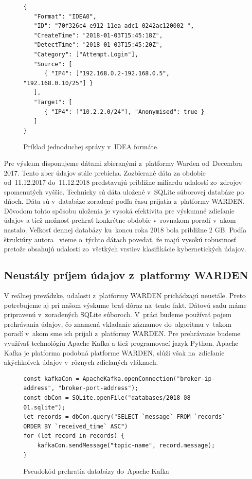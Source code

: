 \documentclass[thesismargins, thesislinespacing, openright, upjsfrontpage]{rnthesis}
\begin{document}
\begin{figure}
    \begin{lstlisting}[]  
{
   "Format": "IDEA0",
   "ID": "70f326c4-e912-11ea-adc1-0242ac120002 ",
   "CreateTime": "2018-01-03T15:45:18Z",
   "DetectTime": "2018-01-03T15:45:20Z",
   "Category": ["Attempt.Login"],
   "Source": [
      { "IP4": ["192.168.0.2-192.168.0.5", "192.168.0.10/25"] }
   ],
   "Target": [
      { "IP4": ["10.2.2.0/24"], "Anonymised": true }
   ]
}
    \end{lstlisting}
    
    \caption{Príklad jednoduchej správy v~IDEA formáte.}
    \label{alg:idea}
\end{figure}

Pre výskum disponujeme dátami zbieranými z~platformy Warden od~Decembra 2017. Tento zber údajov stále prebieha. Zozbierané dáta za obdobie od~11.12.2017 do~11.12.2018 predstavujú približne miliardu udalostí zo~zdrojov spomenutých vyššie. Technicky sú dáta uložené v~SQLite súborovej databáze po dňoch. Dáta sú v~databáze zoradené podľa času prijatia z~platformy WARDEN. Dôvodom tohto spôsobu uloženia je vysoká efektivita pre výskumné zdieľanie údajov a tiež možnosť prehrať konkrétne obdobie v~rovnakom poradí v~akom nastalo. Veľkosť dennej databázy ku~koncu roka 2018 bola približne 2 GB. Podľa štruktúry autora~\cite{wang2013cyber} vieme o~týchto dátach povedať, že majú vysokú robustnosť pretože obsahujú udalosti zo~všetkých vrstiev klasifikácie kybernetických údajov.

\subsection{Neustály príjem údajov z~platformy WARDEN}

V reálnej prevádzke, udalosti z~platformy WARDEN prichádzajú neustále. Preto potrebujeme aj pri našom výskume brať dôraz na~tento fakt. Dátovú sadu máme pripravenú v~zoradených SQLite súboroch. V~práci budeme používať pojem prehrávania údajov, čo znamená vkladanie záznamov do~algoritmu v~takom poradí v~akom sme ich prijali z~platformy WARDEN. Pre prehrávanie budeme využívať technológiu Apache Kafka a tiež programovací jazyk Python. Apache Kafka je platforma podobná platforme WARDEN, slúži však na~zdieľanie akýchkoľvek údajov v~rôznych zdielaných vláknach. 

\begin{figure}
    \begin{lstlisting}[]  
const kafkaCon = ApacheKafka.openConnection("broker-ip-address", "broker-port-address");
const dbCon = SQLite.openFile("databases/2018-08-01.sqlite");
let records = dbCon.query("SELECT `message` FROM `records` ORDER BY `received_time` ASC")
for (let record in records) {
    kafkaCon.sendMessage("topic-name", record.message);
}
    \end{lstlisting}
    
    \caption{Pseudokód prehratia databázy do~Apache Kafka}
    \label{alg:prehratie}
\end{figure}
\end{document}
